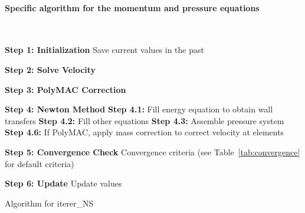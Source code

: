 \paragraph{Specific algorithm for the momentum and pressure equations}\mbox{}\\
\begin{algorithm}[H]
  \SetAlgoLined
  
  \BlankLine
  \textbf{Step 1: Initialization}\;
  Save current values in the past\;
  
  \BlankLine
  \textbf{Step 2: Solve Velocity}\;
  
  \BlankLine
  \textbf{Step 3: PolyMAC Correction}\;
  
  \BlankLine
  \textbf{Step 4: Newton Method}\;
  \textbf{Step 4.1:} Fill energy equation to obtain wall transfers\;
  \textbf{Step 4.2:} Fill other equations\;
  \textbf{Step 4.3:} Assemble pressure system\;
  \textbf{Step 4.6:} If PolyMAC, apply mass correction to correct velocity at elements\;
  
  \BlankLine
  \textbf{Step 5: Convergence Check}\;
  Convergence criteria (see Table~\ref{tab:convergence} for default criteria)\;
  
  \BlankLine
  \textbf{Step 6: Update}\;
  Update values\;
  
  \caption{Algorithm for iterer_NS}
\end{algorithm}

